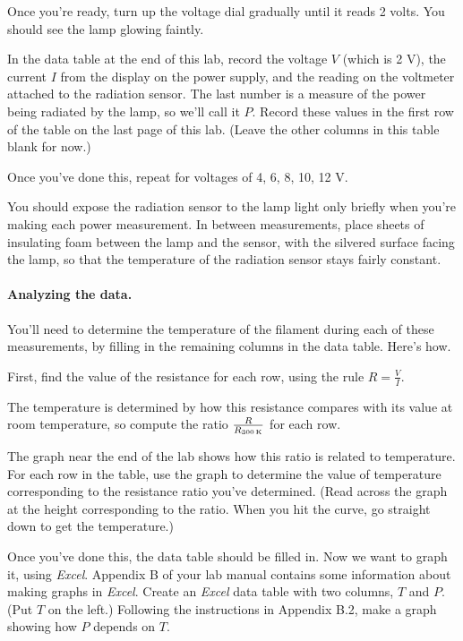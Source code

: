 Once you're ready, turn up the voltage dial gradually until it reads 2 volts.
You should see the lamp glowing faintly.

In the data table at the end of this lab, record the voltage $V$ (which is 2 V),
the current $I$ from the display on the power supply,
and the reading on the voltmeter
attached to the radiation sensor. The last number is a measure
of the power being radiated by the lamp, so we'll call it $P$. 
Record these values
in the first row of the table on the last page of this lab. (Leave
the other columns in this table blank for now.)

Once you've done this, repeat for voltages of 4, 6, 8, 10, 12 V.

You should expose the radiation sensor to the lamp light only briefly
when you're making each power measurement. In between measurements, place 
sheets of insulating foam between the lamp and the sensor, with the silvered
surface facing the lamp, so that the temperature of the radiation sensor
stays fairly constant.


\paragraph{Analyzing the data.}
You'll need to determine the temperature of the filament during each of these
measurements, by filling in the remaining columns in the data table. Here's
how. 

First, find the value of the resistance for each row, using the rule $R=\frac{V}{I}$. 

The temperature is determined by how this resistance compares with its
value at room temperature, so compute the ratio ${\frac{R}{R_{300\,{\rm K}}}}$
for each row.

The graph near the end of the lab 
shows how this ratio is related to temperature.
For each row in the table, use the graph to determine the value of 
temperature corresponding to the resistance ratio you've determined.
(Read across the graph at the height corresponding to the ratio.
When you hit the curve, go straight down to get the temperature.)

Once you've done this, the data table should be filled in.
Now we want to graph it, using \textit{Excel}. Appendix B of your
lab manual contains some information about making graphs in \textit{Excel}.
Create an \textit{Excel} data table with two columns, $T$ and $P$. (Put
$T$ on the left.) Following the instructions in Appendix B.2, make
a graph showing how $P$ depends on $T$. 

